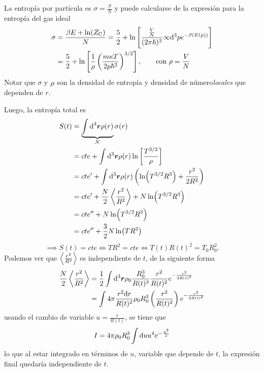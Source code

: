 \begin{sol}
	La entropía por partícula es $\sigma=\frac{S}{N}$ y puede calcularse de la expresión para la entropía del gas ideal
	\begin{align}
  \sigma&=\frac{\beta E+\ln(Z_{\rm C} )}{N}=\frac{5}{2}+\ln\left[\frac{\frac{V}{N}}{(2\pi\hbar)^3}\infty\dd^3pe^{-\beta(E(p))}\right]\\
  &=\frac{5}{2}+\ln\left[\frac{1}{\rho}\left(\frac{m\kappa T}{2p\hbar^2}\right)^{3/2}\right],\qquad \text{con } \rho=\frac{V}{N}
\end{align}
Notar que $\sigma$ y $\rho$ son la densidad de entropía y densidad de número\textit{locales} que dependen de $r$.

Luego, la entropía total es
\begin{align}
  S(t)&=\underbrace{\int\dd^3\vec{r}\r(r)}_{N}\sigma(r)\\
  &=cte +\int\dd^3\vec{r}\r(r)\ln\left[\frac{T^{3/2}}{\r }\right]\\
  &=cte'+\int\dd^3\vec{r}\r(r)\left(\ln(T^{3/2}R^3)+\frac{r^2}{2R^2}\right)\\
  &=cte'+\frac{N}{2}\ev{\frac{r^2}{R^2}}+N\ln(T^{3/2}R^3)\\
  &=cte''+N\ln(T^{3/2}R^3)\\
  &=cte''+\frac{3}{2}N\ln(TR^2)
\end{align}
\begin{equation}
  \implies S(t)=cte\Leftrightarrow TR^2=cte\Leftrightarrow T(t)R(t)^2=T_0R_0^2.
\end{equation}
Podemos ver que $\ev{\frac{r^2}{R^2}}$ es independiente de $t$, de la siguiente forma
\begin{align}
  \frac{N}{2}\ev{\frac{r^2}{R^2}}&=\frac{1}{2}\int\dd^3\vec{r}\r_0\frac{R_0^3}{R(t)^3}\frac{r^2}{R(t)^2}e^{-\frac{r^2}{2R(t)^2}}\\
  &=\int 4\p\frac{r^2\dd r}{R(t)^2}\r_0R_0^3\left(\frac{r^2}{R(t)^2}\right)e^{-\frac{r^2}{2R(t)^2}}
\end{align}
usando el cambio de variable $u=\frac{r}{R(t)}$, se tiene que
\begin{equation}
  I=4\pi \rho_0R_0^3\int\dd uu^4e^{-\frac{u^2}{2}}
\end{equation}
lo que al estar integrado en términos de $u$, variable que depende de $t$, la expresión final quedaría independiente de $t$.
\end{sol}




